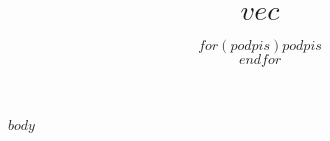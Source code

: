 \documentclass[11pt,a4paper,czech]{article}
\begin{document}
\title{$vec$}

$body$

\signature{$for(podpis)$$podpis$ \\$endfor$}
\end{document}
